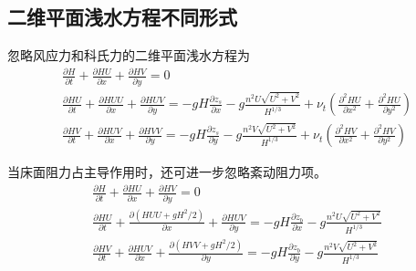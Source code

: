 \subsection{二维平面浅水方程不同形式}
忽略风应力和科氏力的二维平面浅水方程为
\begin{equation}
  \begin{gathered}
    \frac{\partial H}{\partial t} +
    \frac{\partial HU}{\partial x} +
    \frac{\partial HV}{\partial y}
    =
    0
    \\
    \frac{\partial HU}{\partial t} +
    \frac{\partial HUU}{\partial x} +
    \frac{\partial HUV}{\partial y}
    =
    -gH\frac{\partial  z_{s}}{\partial x}
    -g\frac{n^{2}U\sqrt{U^{2}+V^{2}}}{H^{1/3}}
    +
    \nu_{t}\left(
    \frac{\partial^{2}HU}{\partial x^{2}}+
    \frac{\partial^{2}HU}{\partial y^{2}}
    \right)
    \\
    \frac{\partial HV}{\partial t} +
    \frac{\partial HUV}{\partial x} +
    \frac{\partial HVV}{\partial y}
    =
    -gH\frac{\partial  z_{s}}{\partial y}
    -g\frac{n^{2}V\sqrt{U^{2}+V^{2}}}{H^{1/3}}
    +
    \nu_{t}\left(
    \frac{\partial^{2}HV}{\partial x^{2}}+
    \frac{\partial^{2}HV}{\partial y^{2}}
    \right)
  \end{gathered}
\end{equation}

当床面阻力占主导作用时，还可进一步忽略紊动阻力项。
\begin{equation}
  \begin{gathered}
    \frac{\partial H}{\partial t} +
    \frac{\partial HU}{\partial x} +
    \frac{\partial HV}{\partial y}
    =
    0
    \\
    \frac{\partial HU}{\partial t} +
    \frac{\partial (HUU+gH^{2}/2)}{\partial x} +
    \frac{\partial HUV}{\partial y}
    =
    -gH\frac{\partial z_{b}}{\partial x}
    -g\frac{n^{2}U\sqrt{U^{2}+V^{2}}}{H^{1/3}}
    \\
    \frac{\partial HV}{\partial t} +
    \frac{\partial HUV}{\partial x} +
    \frac{\partial (HVV+gH^{2}/2)}{\partial y}
    =
    -gH\frac{\partial z_{b}}{\partial y}
    -g\frac{n^{2}V\sqrt{U^{2}+V^{2}}}{H^{1/3}}
  \end{gathered}
\end{equation}

